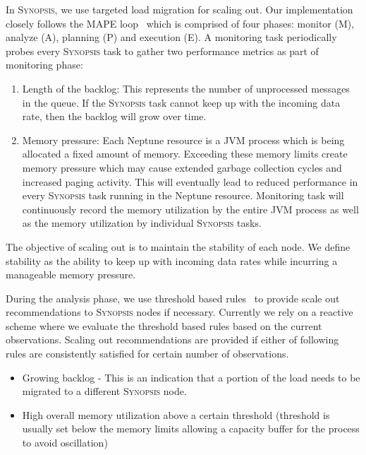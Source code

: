 In \textsc{Synopsis}, we use targeted load migration for scaling out.
Our implementation closely follows the MAPE loop~\cite{maurer2011revealing} which is comprised of four phases: monitor (M), analyze (A), planning (P) and execution (E).
A monitoring task periodically probes every \textsc{Synopsis} task to gather two performance metrics as part of monitoring phase:
\begin{enumerate}[leftmargin=*]
	\item Length of the backlog: This represents the number of unprocessed messages in the queue. If the \textsc{Synopsis} task cannot keep up with the incoming data rate, then the backlog will grow over time.
	\item Memory pressure: Each Neptune resource is a JVM process which is being allocated a fixed amount of memory. 
	Exceeding these memory limits create memory pressure which may cause extended garbage collection cycles and increased paging activity. 
	This will eventually lead to reduced performance in every  \textsc{Synopsis} task running in the Neptune resource.
	Monitoring task will continuously record the memory utilization by the entire JVM process as well as the memory utilization by individual \textsc{Synopsis} tasks.
\end{enumerate} 

The objective of scaling out is to maintain the stability of each node.
We define stability as the ability to keep up with incoming data rates while incurring a manageable memory pressure.

During the analysis phase, we use threshold based rules~\cite{lorido2012auto} to provide scale out recommendations to \textsc{Synopsis} nodes if necessary.
Currently we rely on a reactive scheme where we evaluate the threshold based rules based on the current observations.
Scaling out recommendations are provided if either of following rules are consistently satisfied for certain number of observations.
\begin{itemize}[leftmargin=*]  
\item Growing backlog - This is an indication that a portion of the load needs to be migrated to a different \textsc{Synopsis} node.
\item High overall memory utilization above a certain threshold (threshold is usually set below the memory limits allowing a capacity buffer for the process to avoid oscillation)
\end{itemize}

